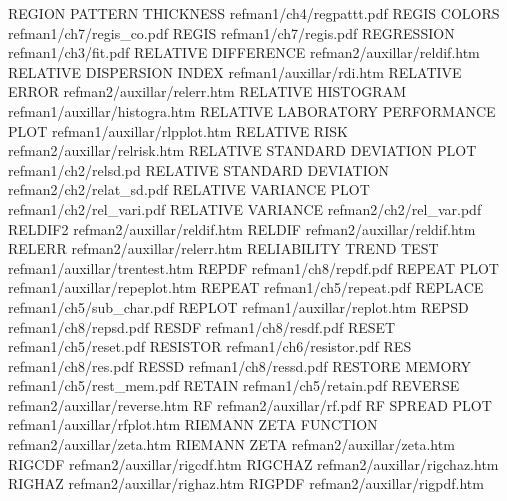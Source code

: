 REGION PATTERN THICKNESS                refman1/ch4/regpattt.pdf
REGIS COLORS                            refman1/ch7/regis_co.pdf
REGIS                                   refman1/ch7/regis.pdf
REGRESSION                              refman1/ch3/fit.pdf
RELATIVE DIFFERENCE                     refman2/auxillar/reldif.htm
RELATIVE DISPERSION INDEX               refman1/auxillar/rdi.htm
RELATIVE ERROR                          refman2/auxillar/relerr.htm
RELATIVE HISTOGRAM                      refman1/auxillar/histogra.htm
RELATIVE LABORATORY PERFORMANCE PLOT    refman1/auxillar/rlpplot.htm
RELATIVE RISK                           refman2/auxillar/relrisk.htm
RELATIVE STANDARD DEVIATION PLOT        refman1/ch2/relsd.pd
RELATIVE STANDARD DEVIATION             refman2/ch2/relat_sd.pdf
RELATIVE VARIANCE PLOT                  refman1/ch2/rel_vari.pdf
RELATIVE VARIANCE                       refman2/ch2/rel_var.pdf
RELDIF2                                 refman2/auxillar/reldif.htm
RELDIF                                  refman2/auxillar/reldif.htm
RELERR                                  refman2/auxillar/relerr.htm
RELIABILITY TREND TEST                  refman1/auxillar/trentest.htm
REPDF                                   refman1/ch8/repdf.pdf
REPEAT PLOT                             refman1/auxillar/repeplot.htm
REPEAT                                  refman1/ch5/repeat.pdf
REPLACE                                 refman1/ch5/sub_char.pdf
REPLOT                                  refman1/auxillar/replot.htm
REPSD                                   refman1/ch8/repsd.pdf
RESDF                                   refman1/ch8/resdf.pdf
RESET                                   refman1/ch5/reset.pdf
RESISTOR                                refman1/ch6/resistor.pdf
RES                                     refman1/ch8/res.pdf
RESSD                                   refman1/ch8/ressd.pdf
RESTORE MEMORY                          refman1/ch5/rest_mem.pdf
RETAIN                                  refman1/ch5/retain.pdf
REVERSE                                 refman2/auxillar/reverse.htm
RF                                      refman2/auxillar/rf.pdf
RF SPREAD PLOT                          refman1/auxillar/rfplot.htm
RIEMANN ZETA FUNCTION                   refman2/auxillar/zeta.htm
RIEMANN ZETA                            refman2/auxillar/zeta.htm
RIGCDF                                  refman2/auxillar/rigcdf.htm
RIGCHAZ                                 refman2/auxillar/rigchaz.htm
RIGHAZ                                  refman2/auxillar/righaz.htm
RIGPDF                                  refman2/auxillar/rigpdf.htm
